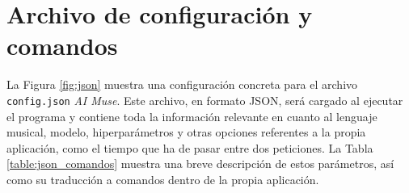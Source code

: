     



\section{Archivo de configuración y comandos}

La Figura \ref{fig:json} muestra una configuración concreta para el archivo \texttt{config.json} \emph{AI Muse}. Este archivo, en formato JSON, será cargado al ejecutar el programa y contiene toda la información relevante en cuanto al lenguaje musical, modelo, hiperparámetros y otras opciones referentes a la propia aplicación, como el tiempo que ha de pasar entre dos peticiones. La Tabla \ref{table:json_comandos} muestra una breve descripción de estos parámetros, así como su traducción a comandos dentro de la propia aplicación.




